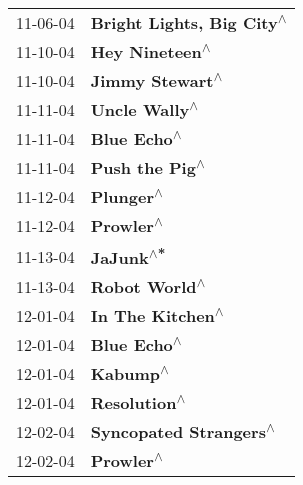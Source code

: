\begin{supertabular}{p{0.25\columnwidth}p{0.75\columnwidth}}
 11-06-04 &                                                  \textbf{Bright Lights, Big City\textsuperscript{$\wedge$}} \\
 11-10-04 &                                                             \textbf{Hey Nineteen\textsuperscript{$\wedge$}} \\
 11-10-04 &                                                            \textbf{Jimmy Stewart\textsuperscript{$\wedge$}} \\
 11-11-04 &                                                              \textbf{Uncle Wally\textsuperscript{$\wedge$}} \\
 11-11-04 &                                                                \textbf{Blue Echo\textsuperscript{$\wedge$}} \\
 11-11-04 &                                                             \textbf{Push the Pig\textsuperscript{$\wedge$}} \\
 11-12-04 &                                                                  \textbf{Plunger\textsuperscript{$\wedge$}} \\
 11-12-04 &                                                                  \textbf{Prowler\textsuperscript{$\wedge$}} \\
 11-13-04 &                                                                  \textbf{JaJunk\textsuperscript{$\wedge$*}} \\
 11-13-04 &                                                              \textbf{Robot World\textsuperscript{$\wedge$}} \\
 12-01-04 &                                                           \textbf{In The Kitchen\textsuperscript{$\wedge$}} \\
 12-01-04 &                                                                \textbf{Blue Echo\textsuperscript{$\wedge$}} \\
 12-01-04 &                                                                   \textbf{Kabump\textsuperscript{$\wedge$}} \\
 12-01-04 &                                                               \textbf{Resolution\textsuperscript{$\wedge$}} \\
 12-02-04 &                                                     \textbf{Syncopated Strangers\textsuperscript{$\wedge$}} \\
 12-02-04 &                                                                  \textbf{Prowler\textsuperscript{$\wedge$}} \\

\end{supertabular}
